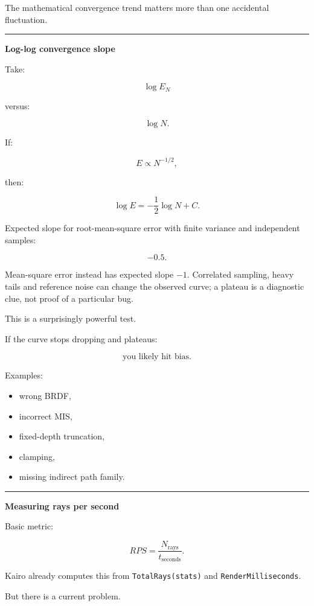 The mathematical convergence trend matters more than one accidental fluctuation.

\begin{center}\rule{0.5\linewidth}{0.5pt}\end{center}

\textbf{Log-log convergence slope}

Take:

\[
\log E_N
\]

versus:

\[
\log N.
\]

If:

\[
E\propto N^{-1/2},
\]

then:

\[
\log E
=
-\frac12\log N+C.
\]

Expected slope for root-mean-square error with finite variance and independent samples:

\[
\boxed{-0.5.}
\]

Mean-square error instead has expected slope \(-1\). Correlated sampling, heavy tails and reference noise can change the observed curve; a plateau is a diagnostic clue, not proof of a particular bug.

This is a surprisingly powerful test.

If the curve stops dropping and plateaus:

\[
\boxed{
\text{you likely hit bias}.
}
\]

Examples:

\begin{itemize}
\tightlist
\item
  wrong BRDF,
\item
  incorrect MIS,
\item
  fixed-depth truncation,
\item
  clamping,
\item
  missing indirect path family.
\end{itemize}

\begin{center}\rule{0.5\linewidth}{0.5pt}\end{center}

\textbf{Measuring rays per second}

Basic metric:

\[
\boxed{
RPS
=
\frac{
N_{\text{rays}}
}{
t_{\text{seconds}}
}.
}
\]

Kairo already computes this from \texttt{TotalRays(stats)} and \texttt{RenderMilliseconds}.

But there is a current problem.

